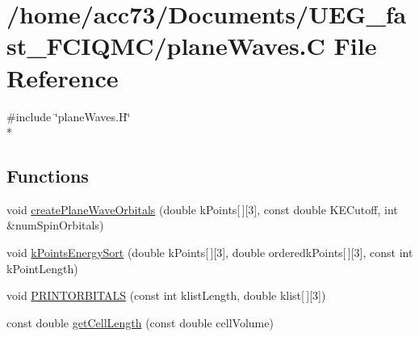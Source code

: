 \hypertarget{planeWaves_8C}{\section{/home/acc73/\-Documents/\-U\-E\-G\-\_\-fast\-\_\-\-F\-C\-I\-Q\-M\-C/plane\-Waves.C File Reference}
\label{planeWaves_8C}
}
{\ttfamily \#include \char`\"{}plane\-Waves.\-H\char`\"{}}\\*
\subsection*{Functions}
\begin{DoxyCompactItemize}
\item 
void \hyperlink{planeWaves_8C_a7f031a58558d27a9ac10ccaa91c0b687}{create\-Plane\-Wave\-Orbitals} (double k\-Points\mbox{[}$\,$\mbox{]}\mbox{[}3\mbox{]}, const double K\-E\-Cutoff, int \&num\-Spin\-Orbitals)
\item 
void \hyperlink{planeWaves_8C_af1dd979f3da378994fc120e81ca54de6}{k\-Points\-Energy\-Sort} (double k\-Points\mbox{[}$\,$\mbox{]}\mbox{[}3\mbox{]}, double orderedk\-Points\mbox{[}$\,$\mbox{]}\mbox{[}3\mbox{]}, const int k\-Point\-Length)
\item 
void \hyperlink{planeWaves_8C_a57a7c35693ab0bf2b167da0e2660c0ca}{P\-R\-I\-N\-T\-O\-R\-B\-I\-T\-A\-L\-S} (const int klist\-Length, double klist\mbox{[}$\,$\mbox{]}\mbox{[}3\mbox{]})
\item 
const double \hyperlink{planeWaves_8C_ac6dd2d721900579d23395c49cd3a6ed5}{get\-Cell\-Length} (const double cell\-Volume)
\end{DoxyCompactItemize}


